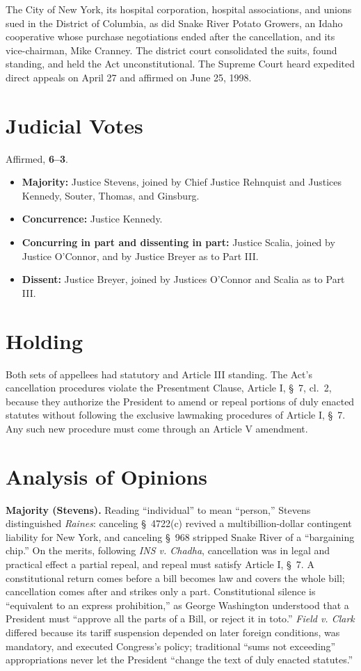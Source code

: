 \documentclass[12pt]{article}
\begin{document}
The City of New York, its hospital corporation, hospital associations, and unions sued in the District of Columbia, as did Snake River Potato Growers, an Idaho cooperative whose purchase negotiations ended after the cancellation, and its vice-chairman, Mike Cranney. The district court consolidated the suits, found standing, and held the Act unconstitutional. The Supreme Court heard expedited direct appeals on April 27 and affirmed on June 25, 1998.

\section{Judicial Votes}

Affirmed, \textbf{6--3}.
\begin{itemize}
\item \textbf{Majority:} Justice Stevens, joined by Chief Justice Rehnquist and Justices Kennedy, Souter, Thomas, and Ginsburg.
\item \textbf{Concurrence:} Justice Kennedy.
\item \textbf{Concurring in part and dissenting in part:} Justice Scalia, joined by Justice O'Connor, and by Justice Breyer as to Part III.
\item \textbf{Dissent:} Justice Breyer, joined by Justices O'Connor and Scalia as to Part III.
\end{itemize}

\section{Holding}

Both sets of appellees had statutory and Article III standing. The Act's cancellation procedures violate the Presentment Clause, Article I, \S~7, cl.~2, because they authorize the President to amend or repeal portions of duly enacted statutes without following the exclusive lawmaking procedures of Article I, \S~7. Any such new procedure must come through an Article V amendment.

\section{Analysis of Opinions}

\textbf{Majority (Stevens).} Reading ``individual'' to mean ``person,'' Stevens distinguished \textit{Raines}: canceling \S~4722(c) revived a multibillion-dollar contingent liability for New York, and canceling \S~968 stripped Snake River of a ``bargaining chip.'' On the merits, following \textit{INS v. Chadha}, cancellation was in legal and practical effect a partial repeal, and repeal must satisfy Article I, \S~7. A constitutional return comes before a bill becomes law and covers the whole bill; cancellation comes after and strikes only a part. Constitutional silence is ``equivalent to an express prohibition,'' as George Washington understood that a President must ``approve all the parts of a Bill, or reject it in toto.'' \textit{Field v. Clark} differed because its tariff suspension depended on later foreign conditions, was mandatory, and executed Congress's policy; traditional ``sums not exceeding'' appropriations never let the President ``change the text of duly enacted statutes.''
\end{document}
